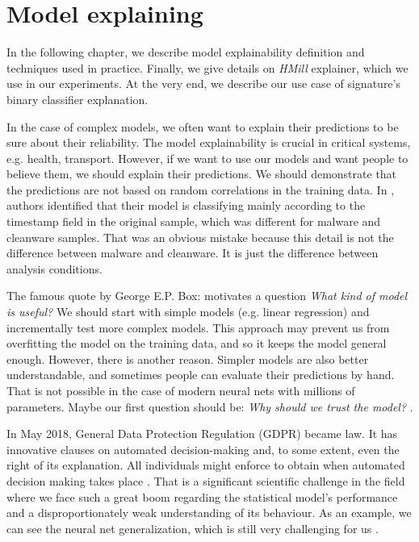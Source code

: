 \chapter{Model explaining} \label{chap:expth}
In the following chapter, we describe model explainability definition and techniques used in practice. Finally, we give details on \emph{HMill} explainer, which we use in our experiments. At the very end, we describe our use case of signature's binary classifier explanation.

In the case of complex models, we often want to explain their predictions to be sure about their reliability. The model explainability is crucial in critical systems, e.g. health, transport. However, if we want to use our models and want people to believe them, we should explain their predictions. We should demonstrate that the predictions are not based on random correlations in the training data. In \cite{Pevny2020}, authors identified that their model is classifying mainly according to the timestamp field in the original sample, which was different for malware and cleanware samples. That was an obvious mistake because this detail is not the difference between malware and cleanware. It is just the difference between analysis conditions.

The famous quote by George E.P. Box:  motivates a question \emph{What kind of model is useful?} We should start with simple models (e.g. linear regression) and incrementally test more complex models. This approach may prevent us from overfitting the model on the training data, and so it keeps the model general enough. However, there is another reason. Simpler models are also better understandable, and sometimes people can evaluate their predictions by hand. That is not possible in the case of modern neural nets with millions of parameters. Maybe our first question should be: \emph{Why should we trust the model?} \cite{Ribeiro2016}.

In May 2018, General Data Protection Regulation (GDPR) became law. It has innovative clauses on automated decision-making and, to some extent, even the right of its explanation. All individuals might enforce to obtain  when automated decision making takes place \cite{Guidotti2018}. That is a significant scientific challenge in the field where we face such a great boom regarding the statistical model's performance and a disproportionately weak understanding of its behaviour. As an example, we can see the neural net generalization, which is still very challenging for us \cite{Zhang2016}.

